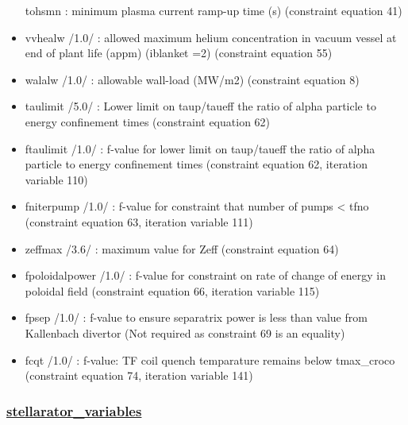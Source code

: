 \documentclass[]{article}
\begin{document}
\begin{itemize}
  tohsmn : minimum plasma current ramp-up time (s) (constraint equation
  41)
\item
  vvhealw /1.0/ : allowed maximum helium concentration in vacuum vessel
  at end of plant life (appm) (iblanket =2) (constraint equation 55)
\item
  walalw /1.0/ : allowable wall-load (MW/m2) (constraint equation 8)
\item
  taulimit /5.0/ : Lower limit on taup/taueff the ratio of alpha
  particle to energy confinement times (constraint equation 62)
\item
  ftaulimit /1.0/ : f-value for lower limit on taup/taueff the ratio of
  alpha particle to energy confinement times (constraint equation 62,
  iteration variable 110)
\item
  fniterpump /1.0/ : f-value for constraint that number of pumps
  \textless{} tfno (constraint equation 63, iteration variable 111)
\item
  zeffmax /3.6/ : maximum value for Zeff (constraint equation 64)
\item
  fpoloidalpower /1.0/ : f-value for constraint on rate of change of
  energy in poloidal field (constraint equation 66, iteration variable
  115)
\item
  fpsep /1.0/ : f-value to ensure separatrix power is less than value
  from Kallenbach divertor (Not required as constraint 69 is an
  equality)
\item
  fcqt /1.0/ : f-value: TF coil quench temparature remains below
  tmax\_croco (constraint equation 74, iteration variable 141)
\end{itemize}

\subsubsection{\href{stellarator_variables.html}{stellarator\_variables}}
\end{document}
